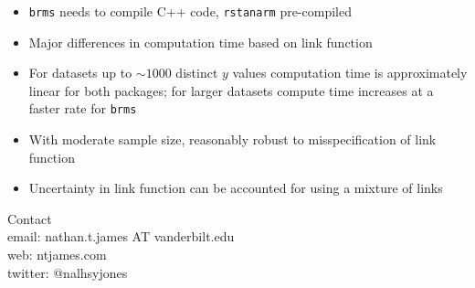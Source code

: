 \documentclass{beamer}
\begin{document}
	\begin{frame}
		\begin{itemize}
			\item \texttt{brms} needs to compile C++ code, \texttt{rstanarm} pre-compiled
			\item Major differences in computation time based on link function
			\item For datasets up to $\sim 1000$ distinct $y$ values
			computation time is approximately linear for both packages; for larger datasets compute time increases at a faster rate for \texttt{brms}
		\end{itemize}
		\begin{center}
		\end{center}
		\end{frame}

		\begin{frame}
		\begin{itemize}
			\item With moderate sample size, reasonably robust to misspecification of link function
			\item Uncertainty in link function can be accounted for using a mixture of links
		\end{itemize}			
		\begin{center}
		\end{center}
		\end{frame}
	
	\begin{frame}
	Contact\\
	email: nathan.t.james AT vanderbilt.edu\\
	web: ntjames.com\\
	twitter: @nalhsyjones
	\end{frame}
\end{document}

